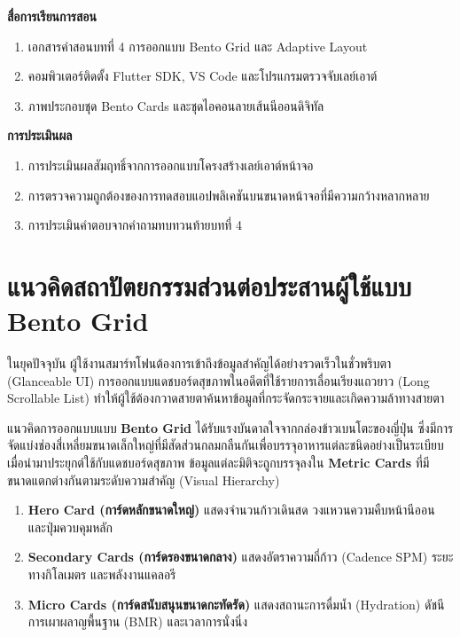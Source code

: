 \noindent\textbf{สื่อการเรียนการสอน}
\begin{enumerate}
    \item เอกสารคำสอนบทที่ 4 การออกแบบ Bento Grid และ Adaptive Layout
    \item คอมพิวเตอร์ติดตั้ง Flutter SDK, VS Code และโปรแกรมตรวจจับเลย์เอาต์
    \item ภาพประกอบชุด Bento Cards และชุดไอคอนลายเส้นนีออนดิจิทัล
\end{enumerate}

\noindent\textbf{การประเมินผล}
\begin{enumerate}
    \item การประเมินผลสัมฤทธิ์จากการออกแบบโครงสร้างเลย์เอาต์หน้าจอ
    \item การตรวจความถูกต้องของการทดสอบแอปพลิเคชันบนขนาดหน้าจอที่มีความกว้างหลากหลาย
    \item การประเมินคำตอบจากคำถามทบทวนท้ายบทที่ 4
\end{enumerate}

\newpage

\section{แนวคิดสถาปัตยกรรมส่วนต่อประสานผู้ใช้แบบ Bento Grid}
ในยุคปัจจุบัน ผู้ใช้งานสมาร์ทโฟนต้องการเข้าถึงข้อมูลสำคัญได้อย่างรวดเร็วในชั่วพริบตา (Glanceable UI) การออกแบบแดชบอร์ดสุขภาพในอดีตที่ใช้รายการเลื่อนเรียงแถวยาว (Long Scrollable List) ทำให้ผู้ใช้ต้องกวาดสายตาค้นหาข้อมูลที่กระจัดกระจายและเกิดความล้าทางสายตา

แนวคิดการออกแบบแบบ \textbf{Bento Grid} ได้รับแรงบันดาลใจจากกล่องข้าวเบนโตะของญี่ปุ่น ซึ่งมีการจัดแบ่งช่องสี่เหลี่ยมขนาดเล็กใหญ่ที่มีสัดส่วนกลมกลืนกันเพื่อบรรจุอาหารแต่ละชนิดอย่างเป็นระเบียบ เมื่อนำมาประยุกต์ใช้กับแดชบอร์ดสุขภาพ ข้อมูลแต่ละมิติจะถูกบรรจุลงใน \textbf{Metric Cards} ที่มีขนาดแตกต่างกันตามระดับความสำคัญ (Visual Hierarchy)

\begin{enumerate}
    \item \textbf{Hero Card (การ์ดหลักขนาดใหญ่)} แสดงจำนวนก้าวเดินสด วงแหวนความคืบหน้านีออน และปุ่มควบคุมหลัก
    \item \textbf{Secondary Cards (การ์ดรองขนาดกลาง)} แสดงอัตราความถี่ก้าว (Cadence SPM) ระยะทางกิโลเมตร และพลังงานแคลอรี
    \item \textbf{Micro Cards (การ์ดสนับสนุนขนาดกะทัดรัด)} แสดงสถานะการดื่มน้ำ (Hydration) ดัชนีการเผาผลาญพื้นฐาน (BMR) และเวลาการนั่งนิ่ง
\end{enumerate}

